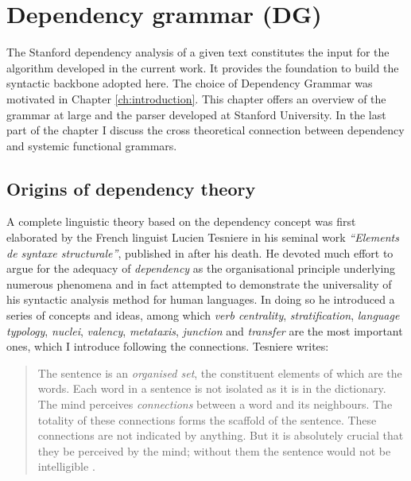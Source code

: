 \chapter{Dependency grammar (DG)}
\label{ch:dependency-grammar}

    The Stanford dependency analysis of a given text constitutes the input for the algorithm developed in the current work. It provides the foundation to build the syntactic backbone adopted here. The choice of Dependency Grammar was motivated in Chapter \ref{ch:introduction}. This chapter offers an overview of the grammar at large and the parser developed at Stanford University. In the last part of the chapter I discuss the cross theoretical connection between dependency and systemic functional grammars.

\section{Origins of dependency theory}
\label{sec:origins}
    A complete linguistic theory based on the dependency concept was first elaborated by the French linguist Lucien Tesniere in his seminal work \textit{``Elements de syntaxe structurale''}, published in \citeyear{Tesniere59} after his death. He devoted much effort to argue for the adequacy of \textit{dependency} as the organisational principle underlying numerous phenomena and in fact attempted to demonstrate the universality of his syntactic analysis method for human languages. In doing so he introduced a series of concepts and ideas, among which \textit{verb centrality}, \textit{stratification}, \textit{language typology}, \textit{nuclei}, \textit{valency}, \textit{metataxis}, \textit{junction} and \textit{transfer} are the most important ones, which I introduce following the connections. Tesniere writes:

    
    \begin{quotation}
        The sentence is an \textit{organised set}, the constituent elements of which are the words. Each word in a sentence is not isolated as it is in the dictionary. The mind perceives \textit{connections} between a word and its neighbours. The totality of these connections forms the scaffold of the sentence. These connections are not indicated by anything. But it is absolutely crucial that they be perceived by the mind; without them the sentence would not be intelligible \citep[3]{Tesniere2015}.
    \end{quotation}

